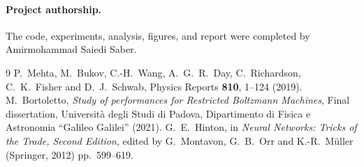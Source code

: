\documentclass[10pt,twocolumn,a4paper]{article}
\begin{document}
\paragraph{Project authorship.}
The code, experiments, analysis, figures, and report were completed
by Amirmohammad Saiedi Saber.

{\footnotesize
\begin{thebibliography}{9}\itemsep -1pt
 P.~Mehta, M.~Bukov, C.-H.~Wang, A.~G.~R.~Day,
  C.~Richardson, C.~K.~Fisher and D.~J.~Schwab, Physics Reports
  {\bf 810}, 1--124 (2019).
 M.~Bortoletto,
  \emph{Study of performances for Restricted Boltzmann Machines},
  Final dissertation, Universit\`a degli Studi di Padova, Dipartimento
  di Fisica e Astronomia ``Galileo Galilei'' (2021).
 G.~E.~Hinton, in
  \emph{Neural Networks: Tricks of the Trade, Second Edition},
  edited by G.~Montavon, G.~B.~Orr and K.-R.~M\"uller (Springer,
  2012) pp.~599--619.
\end{thebibliography}
}
\end{document}
